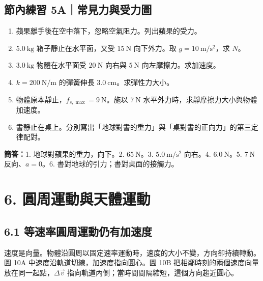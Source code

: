 \documentclass[11pt,a4paper]{article}
\providecommand{\tightlist}{%
  \setlength{\itemsep}{0pt}\setlength{\parskip}{0pt}}
\begin{document}
\begin{HandoutSelfCheck}

\subsection{節內練習 5A｜常見力與受力圖}\label{ux7bc0ux5167ux7df4ux7fd2-5aux5e38ux898bux529bux8207ux53d7ux529bux5716}

\begin{enumerate}
\def\labelenumi{\arabic{enumi}.}
\tightlist
\item
  蘋果離手後在空中落下，忽略空氣阻力。列出蘋果的受力。
\item
  \(5.0\ \mathrm{kg}\) 箱子靜止在水平面，又受 \(15\ \mathrm N\) 向下外力。取 \(g=10\ \mathrm{m/s^2}\)，求 \(N\)。
\item
  \(3.0\ \mathrm{kg}\) 物體在水平面受 \(20\ \mathrm N\) 向右與 \(5\ \mathrm N\) 向左摩擦力。求加速度。
\item
  \(k=200\ \mathrm{N/m}\) 的彈簧伸長 \(3.0\ \mathrm{cm}\)。求彈性力大小。
\item
  物體原本靜止，\(f_{s,\max}=9\ \mathrm N\)。施以 \(7\ \mathrm N\) 水平外力時，求靜摩擦力大小與物體加速度。
\item
  書靜止在桌上。分別寫出「地球對書的重力」與「桌對書的正向力」的第三定律配對。
\end{enumerate}

\textbf{簡答：}1. 地球對蘋果的重力，向下。2. \(65\ \mathrm N\)。3. \(5.0\ \mathrm{m/s^2}\) 向右。4. \(6.0\ \mathrm N\)。5. \(7\ \mathrm N\) 反向、\(a=0\)。6. 書對地球的引力；書對桌面的接觸力。

\end{HandoutSelfCheck}

\section{6. 圓周運動與天體運動}\label{ux5713ux5468ux904bux52d5ux8207ux5929ux9ad4ux904bux52d5}

\subsection{6.1 等速率圓周運動仍有加速度}\label{ux7b49ux901fux7387ux5713ux5468ux904bux52d5ux4ecdux6709ux52a0ux901fux5ea6}

速度是向量。物體沿圓周以固定速率運動時，速度的大小不變，方向卻持續轉動。圖 10A 中速度沿軌道切線，加速度指向圓心。圖 10B 把相鄰時刻的兩個速度向量放在同一起點，\(\Delta\vec v\) 指向軌道內側；當時間間隔縮短，這個方向趨近圓心。
\end{document}
